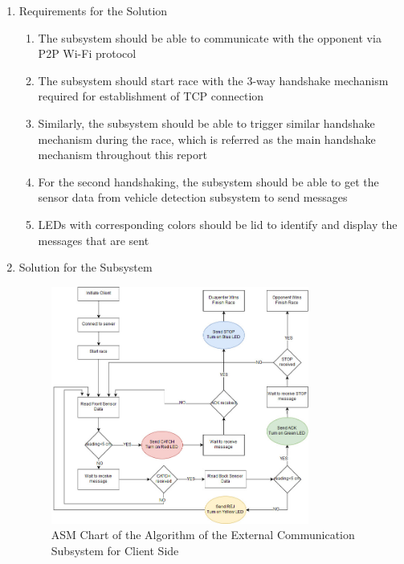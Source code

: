 \documentclass[a4paper,12pt]{article}
\begin{document}
\begin{enumerate}
	\item {Requirements for the Solution}
	
	\begin{enumerate}
		\item The subsystem should be able to communicate with the opponent via P2P Wi-Fi protocol
		\item The subsystem should start race with the 3-way handshake mechanism required for establishment of TCP connection
		\item Similarly, the subsystem should be able to trigger similar handshake mechanism during the race, which is referred as the main handshake mechanism throughout this report
		\item For the second handshaking, the subsystem should be able to get the sensor data from vehicle detection subsystem to send messages
		\item LEDs with corresponding colors should be lid to identify and display the messages that are sent
		
	\end{enumerate}
	
	\item {Solution for the Subsystem}
	
	\begin{figure}[h]
		\includegraphics[width=0.8\textwidth,center]{images/client_asm}
		\caption{ASM Chart of the Algorithm of the External Communication Subsystem for Client Side \label{fig:asmclient} }
	\end{figure}
	

\end{enumerate}
\end{document}
